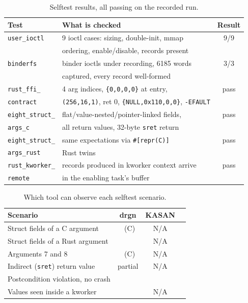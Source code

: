 \documentclass{article}
\newcommand{\cmark}{\ding{51}}
\newcommand{\xmark}{\ding{55}}
\begin{document}
\begin{table}[t]
\centering
\caption{Selftest results, all passing on the recorded run.}\label{tab:correctness}
\small
\begin{tabular}{@{}llc@{}}
\toprule
\textbf{Test} & \textbf{What is checked} & \textbf{Result} \\
\midrule
\texttt{user\_ioctl}      & 9 ioctl cases: sizing, double-init, mmap     & 9/9 \\
                          & ordering, enable/disable, records present    &     \\
\texttt{binderfs}         & binder ioctls under recording, 6185 words    & 3/3 \\
                          & captured, every record well-formed           &     \\
\texttt{rust\_ffi\_}      & 4 arg indices, \texttt{\{0,0,0,0\}} at entry,  & pass \\
\texttt{contract}         & \texttt{(256,16,1)}, ret 0, \texttt{\{NULL,0x110,0,0\}}, \texttt{-EFAULT} & \\
\texttt{eight\_struct\_}  & flat/value-nested/pointer-linked fields,      & pass \\
\texttt{args\_c}          & all return values, 32-byte \texttt{sret} return & \\
\texttt{eight\_struct\_}  & same expectations via \texttt{\#[repr(C)]}      & pass \\
\texttt{args\_rust}       & Rust twins                                     & \\
\texttt{rust\_kworker\_}  & records produced in kworker context arrive     & pass \\
\texttt{remote}           & in the enabling task's buffer                  & \\
\bottomrule
\end{tabular}
\end{table}

\begin{table}[t]
\centering
\caption{Which tool can observe each selftest scenario.}\label{tab:correctness-tools}
\small
\begin{tabular}{@{}lccc@{}}
\toprule
\textbf{Scenario} & \textbf{drgn} & \textbf{KASAN} & \textbf{\toolname{}} \\
\midrule
Struct fields of a C argument    & \cmark~(C) & N/A & \cmark \\
Struct fields of a Rust argument & \xmark & N/A & \cmark \\
Arguments 7 and 8                & \cmark~(C) & N/A & \cmark \\
Indirect (\texttt{sret}) return value & partial & N/A & \cmark \\
Postcondition violation, no crash & \xmark & \xmark & \cmark \\
Values seen inside a kworker     & \xmark & N/A & \cmark \\
\bottomrule
\end{tabular}
\end{table}
\end{document}
